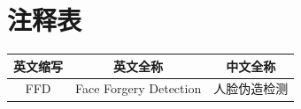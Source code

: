 \chapter*{注释表} %

\begin{center}
\begin{tabular}{ccc} %
\toprule %
\textbf{英文缩写} & \textbf{英文全称} & \textbf{中文全称} \\
\midrule %
FFD & Face Forgery Detection & 人脸伪造检测 \\
\bottomrule %
\end{tabular}
\end{center}
